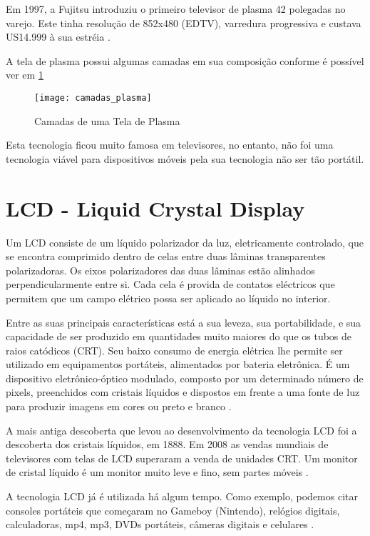 Em 1997, a Fujitsu introduziu o primeiro televisor de plasma 42 polegadas no varejo. Este tinha resolução de 852x480 (EDTV), varredura progressiva e custava US14.999 à sua estréia \cite{WikipediaTelaPlasma}.

A tela de plasma possui algumas camadas em sua composição conforme é possível ver em \ref{fig:camadas_plasma}

\begin{figure}[!h]
  \centering
  \texttt{[image: camadas\_plasma]} 
  \caption{Camadas de uma Tela de Plasma}
  \label{fig:camadas_plasma} 
\end{figure}

Esta tecnologia ficou muito famosa em televisores, no entanto, não foi uma tecnologia viável para dispositivos móveis pela sua tecnologia não ser tão portátil. 


\section{LCD - Liquid Crystal Display}
\label{sec:lcd}

Um LCD consiste de um líquido polarizador da luz, eletricamente controlado, que se encontra comprimido dentro de celas entre duas lâminas transparentes polarizadoras. Os eixos polarizadores das duas lâminas estão alinhados perpendicularmente entre si. Cada cela é provida de contatos eléctricos que permitem que um campo elétrico possa ser aplicado ao líquido no interior.

Entre as suas principais características está a sua leveza, sua portabilidade, e sua capacidade de ser produzido em quantidades muito maiores do que os tubos de raios catódicos (CRT). Seu baixo consumo de energia elétrica lhe permite ser utilizado em equipamentos portáteis, alimentados por bateria eletrônica. É um dispositivo eletrônico-óptico modulado, composto por um determinado número de pixels, preenchidos com cristais líquidos e dispostos em frente a uma fonte de luz para produzir imagens em cores ou preto e branco \cite{WikipediaLCD}.

A mais antiga descoberta que levou ao desenvolvimento da tecnologia LCD foi a descoberta dos cristais líquidos, em 1888. Em 2008 as vendas mundiais de televisores com telas de LCD superaram a venda de unidades CRT. Um monitor de cristal líquido é um monitor muito leve e fino, sem partes móveis \cite{WikipediaLCD}.

A tecnologia LCD já é utilizada há algum tempo. Como exemplo, podemos citar consoles portáteis que começaram no Gameboy (Nintendo), relógios digitais, calculadoras, mp4, mp3, DVDs portáteis, câmeras digitais e celulares \cite{WikipediaLCD}.

